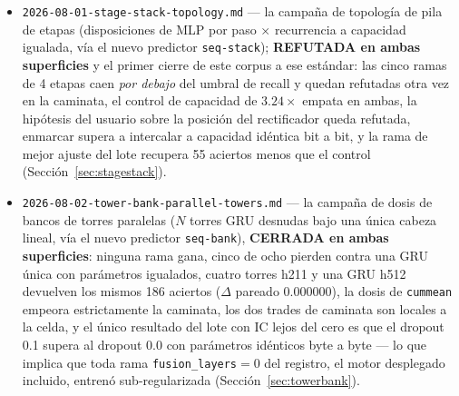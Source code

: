 \documentclass[11pt]{article}
\begin{document}
\begin{itemize}
{    por artista}, la primera palanca de des-eagerización que funciona, y funciona
    porque no puede ser superada por puntuación: \texttt{artist\_conc@10}
    \num{0.692}$\to$\num{0.123} con \texttt{music@10} \emph{subiendo} (IC sobre
    cero) en todos sus ajustes, endurecida en una segunda partición disjunta con
    0.64 de fríos, junto con las refutaciones de las dos palancas blandas a las
    que sustituye (Sección~\ref{sec:walk-controls}). El material a nivel de
    caminata de la Sección~\ref{sec:walk} --- el desajuste de superficie, las
    cuatro métricas de caminata, la frontera ancla $\times$ zancada, el cara a
    cara de muestra emparejada y la reversión de la torre doble --- está
    transcrito del roll-up de \texttt{PROJECT-FACTS.md} de 2026-07-31b y de las
    cuatro herramientas de medición que este cita
    (\texttt{tools/walk\_eval.py}, \texttt{walk\_frontier.py},
    \texttt{walk\_dualgru.py}, \texttt{walk\_headtohead.py}), cuyos docstrings de
    módulo son la autoridad sobre cómo se calcula cada métrica; ese material aún
    no tiene informe de campaña propio.
  \item \texttt{2026-08-01-stage-stack-topology.md} --- la campaña de topología de
    pila de etapas (disposiciones de MLP por paso $\times$ recurrencia a capacidad
    igualada, vía el nuevo predictor \texttt{seq-stack});
    \textbf{REFUTADA en ambas superficies} y el primer cierre de este corpus a ese
    estándar: las cinco ramas de 4 etapas caen \emph{por debajo} del umbral de
    recall y quedan refutadas otra vez en la caminata, el control de capacidad de
    $\num{3.24}\times$ empata en ambas, la hipótesis del usuario sobre la posición
    del rectificador queda refutada, enmarcar supera a intercalar a capacidad
    idéntica bit a bit, y la rama de mejor ajuste del lote recupera \num{55}
    aciertos menos que el control (Sección~\ref{sec:stagestack}).
  \item \texttt{2026-08-02-tower-bank-parallel-towers.md} --- la campaña de dosis
    de bancos de torres paralelas ($N$ torres GRU desnudas bajo una única cabeza
    lineal, vía el nuevo predictor \texttt{seq-bank}), \textbf{CERRADA en ambas
    superficies}: ninguna rama gana, cinco de ocho pierden contra una GRU única con
    parámetros igualados, cuatro torres h211 y una GRU h512 devuelven los mismos
    \num{186} aciertos ($\Delta$ pareado \num{0.000000}), la dosis de
    \texttt{cummean} empeora estrictamente la caminata, los dos trades de caminata
    son locales a la celda, y el único resultado del lote con IC lejos del cero es
    que el dropout \num{0.1} supera al dropout \num{0.0} con parámetros idénticos
    byte a byte --- lo que implica que toda rama \texttt{fusion\_layers}${}=0$ del
    registro, el motor desplegado incluido, entrenó sub-regularizada
    (Sección~\ref{sec:towerbank}).
\end{itemize}
\end{document}

